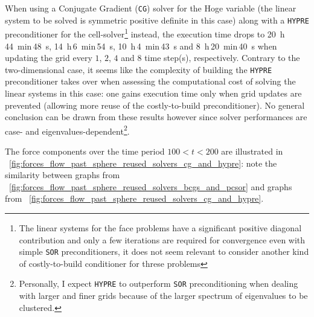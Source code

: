 \documentclass[11pt, a4paper]{article}
\newcommand{\fig}{\figurename \ }
\theoremstyle{remark}
\begin{document}
When using a Conjugate Gradient (\verb|CG|) solver for the Hoge variable (the linear system to be solved is symmetric positive definite in this case) along with a \verb|HYPRE| preconditioner for the cell-solver\footnote{The linear systems for the face problems have a significant positive diagonal contribution and only a few iterations are required for convergence even with simple \texttt{SOR} preconditioners, it does not seem relevant to consider another kind of costly-to-build conditioner for threse problems} instead, the execution time drops to \SI{20}{\hour}\,\SI{44}{\minute}\,\SI{48}{\second}, \SI{14}{\hour}\,\SI{6}{\minute}\,\SI{54}{\second}, \SI{10}{\hour}\,\SI{4}{\minute}\,\SI{43}{\second} and \SI{8}{\hour}\,\SI{20}{\minute}\,\SI{40}{\second} when updating the grid every $1$, $2$, $4$ and $8$ time step(s), respectively. Contrary to the two-dimensional case, it seems like the complexity of building the \verb|HYPRE| preconditioner takes over when assessing the computational cost of solving the linear systems in this case: one gains execution time only when grid updates are prevented (allowing more reuse of the costly-to-build preconditioner). No general conclusion can be drawn from these results however since solver performances are case- and eigenvalues-dependent\footnote{Personally, I expect \texttt{HYPRE} to outperform \texttt{SOR} preconditioning when dealing with larger and finer grids because of the larger spectrum of eigenvalues to be clustered.}. 

The force components over the time period $100 < t < 200$ are illustrated in \fig \ref{fig:forces_flow_past_sphere_reused_solvers_cg_and_hypre}: note the similarity between graphs from \fig \ref{fig:forces_flow_past_sphere_reused_solvers_bcgs_and_pcsor} and graphs from \fig \ref{fig:forces_flow_past_sphere_reused_solvers_cg_and_hypre}. 
\end{document}
